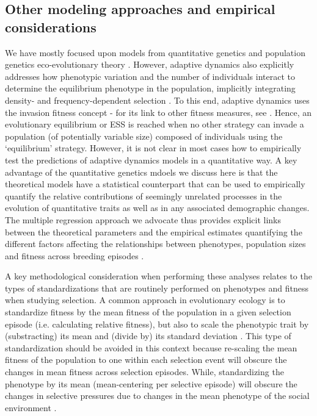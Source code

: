 \documentclass{article}
\begin{document}
\subsection{Other modeling approaches and empirical considerations}
We have mostly focused upon models from quantitative genetics and population genetics  eco-evolutionary theory \citep{Engen2013, Engen2020, Lande2017, Lande2009a}. However, adaptive dynamics also explicitly addresses how phenotypic variation and the number of individuals interact to determine the equilibrium phenotype in the population, implicitly integrating density- and frequency-dependent selection \citep{McGill2007}. To this end, adaptive dynamics uses the invasion fitness concept - for its link to other fitness measures, see \cite{Lehmann2016}. Hence, an evolutionary equilibrium or ESS is reached when no other strategy can invade a population (of potentially variable size) composed of individuals using the `equilibrium' strategy. However, it is not clear in most cases how to empirically test the predictions of adaptive dynamics models in a quantitative way. A key advantage of the quantitative genetics mdoels we discuss here is that the theoretical models have a statistical counterpart that can be used to empirically quantify the relative contributions of seemingly unrelated processes in the evolution of quantitative traits as well as in any associated demographic changes. The multiple regression approach we advocate thus provides explicit links between the theoretical parameters and the empirical estimates quantifying the different factors affecting the relationships between phenotypes, population sizes and fitness across breeding episodes \citep{Lande1983, Queller1992b, Wolf1999SocialSelection, Heisler1987, Goodnight1992}. 

 A key methodological consideration when performing these analyses relates to the types of standardizations that are routinely performed on phenotypes and fitness when studying selection. A common approach in evolutionary ecology is to standardize fitness by the mean fitness of the population in a given selection episode (i.e. calculating relative fitness), but also to scale the phenotypic trait by (substracting) its mean and (divide by) its standard deviation \citep{DeLisle2017}. This type of standardization should be avoided in this context because re-scaling the mean fitness of the population to one within each selection event will obscure the changes in mean fitness across selection episodes. While, standardizing the phenotype by its mean (mean-centering per selective episode) will obscure the changes in selective pressures due to changes in the mean phenotype of the social environment \citep{Araya-Ajoy2020}.
\end{document}
